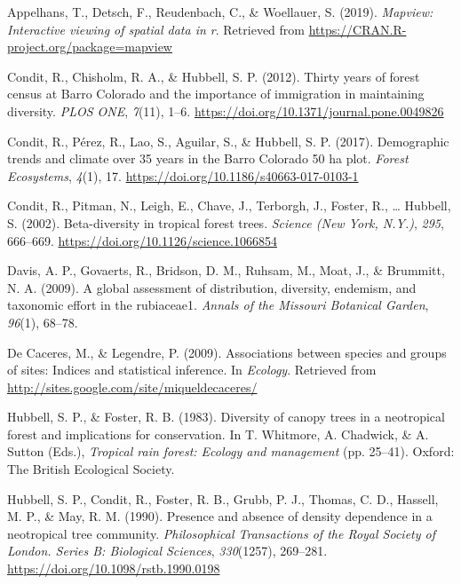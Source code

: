 \documentclass[11pt,]{article}
\begin{document}
\hypertarget{refs}{}
\hypertarget{ref-cita_mapview}{}
Appelhans, T., Detsch, F., Reudenbach, C., \& Woellauer, S. (2019).
\emph{Mapview: Interactive viewing of spatial data in r}. Retrieved from
\url{https://CRAN.R-project.org/package=mapview}

\hypertarget{ref-condit_et_al_2012}{}
Condit, R., Chisholm, R. A., \& Hubbell, S. P. (2012). Thirty years of
forest census at Barro Colorado and the importance of immigration in
maintaining diversity. \emph{PLOS ONE}, \emph{7}(11), 1--6.
\url{https://doi.org/10.1371/journal.pone.0049826}

\hypertarget{ref-condit_et_al_2017}{}
Condit, R., Pérez, R., Lao, S., Aguilar, S., \& Hubbell, S. P. (2017).
Demographic trends and climate over 35 years in the Barro Colorado 50 ha
plot. \emph{Forest Ecosystems}, \emph{4}(1), 17.
\url{https://doi.org/10.1186/s40663-017-0103-1}

\hypertarget{ref-article_condit}{}
Condit, R., Pitman, N., Leigh, E., Chave, J., Terborgh, J., Foster, R.,
\ldots{} Hubbell, S. (2002). Beta-diversity in tropical forest trees.
\emph{Science (New York, N.Y.)}, \emph{295}, 666--669.
\url{https://doi.org/10.1126/science.1066854}

\hypertarget{ref-davis2009global}{}
Davis, A. P., Govaerts, R., Bridson, D. M., Ruhsam, M., Moat, J., \&
Brummitt, N. A. (2009). A global assessment of distribution, diversity,
endemism, and taxonomic effort in the rubiaceae1. \emph{Annals of the
Missouri Botanical Garden}, \emph{96}(1), 68--78.

\hypertarget{ref-cita_indicspecies}{}
De Caceres, M., \& Legendre, P. (2009). Associations between species and
groups of sites: Indices and statistical inference. In \emph{Ecology}.
Retrieved from \url{http://sites.google.com/site/miqueldecaceres/}

\hypertarget{ref-hubell_foster_1983}{}
Hubbell, S. P., \& Foster, R. B. (1983). Diversity of canopy trees in a
neotropical forest and implications for conservation. In T. Whitmore, A.
Chadwick, \& A. Sutton (Eds.), \emph{Tropical rain forest: Ecology and
management} (pp. 25--41). Oxford: The British Ecological Society.

\hypertarget{ref-hubell_et_all_1990}{}
Hubbell, S. P., Condit, R., Foster, R. B., Grubb, P. J., Thomas, C. D.,
Hassell, M. P., \& May, R. M. (1990). Presence and absence of density
dependence in a neotropical tree community. \emph{Philosophical
Transactions of the Royal Society of London. Series B: Biological
Sciences}, \emph{330}(1257), 269--281.
\url{https://doi.org/10.1098/rstb.1990.0198}
\end{document}
